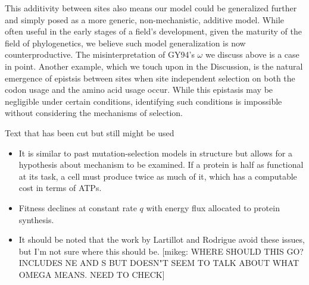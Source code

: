 \documentclass[12pt,letterpaper,fleqn]{article}
\renewcommand{\subsection}[1]{%
\bigskip
\begin{center}
\begin{large}
\normalfont\itshape #1
\end{large}
\end{center}}
\begin{document}
{This additivity between sites also means our model could be generalized further and simply posed as a more generic, non-mechanistic, additive model.
While often useful in the early stages of a field's development, given the maturity of the field of phylogenetics, we believe such model generalization is now counterproductive.
The misinterpretation of GY94's $\omega$ we discuss above is a case in point.
Another example, which we touch upon in the Discussion, is the natural emergence of epistsis between sites when site independent selection on both the codon usage and the amino acid usage occur.
While this epistasis may be negligible under certain conditions, identifying such conditions is impossible without considering the mechanisms of selection.


\subsection*{Text that has been cut but still might be used}
\begin{itemize}
\item It is similar to past mutation-selection models in structure but allows for a hypothesis about mechanism to be examined.
If a protein is half as functional at its task, a cell must produce twice as much of it, which has a computable cost in terms of ATPs.

\item Fitness declines at constant rate $q$ with energy flux allocated to protein synthesis.
\item It should be noted that the work by Lartillot and Rodrigue avoid these issues, but I'm not sure where this should be.
[mikeg: WHERE SHOULD THIS GO? \citet{NielsenAndYang2003} INCLUDES NE AND S BUT DOESN"T SEEM TO TALK ABOUT WHAT OMEGA MEANS.
NEED TO CHECK]

\end{itemize}

\pagebreak
}{}
\end{document}
